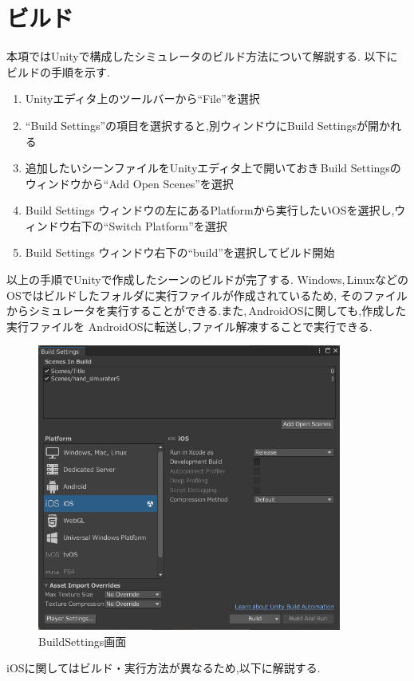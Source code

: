 \documentclass{ltjsreport}
\begin{document}
	\section{ビルド}
		本項ではUnityで構成したシミュレータのビルド方法について解説する.
		以下にビルドの手順を示す.
		\begin{enumerate}
			\item Unityエディタ上のツールバーから``File''を選択
			\item ``Build Settings''の項目を選択すると,別ウィンドウにBuild Settingsが開かれる
			\item 追加したいシーンファイルをUnityエディタ上で開いておき\,Build Settingsのウィンドウから``Add Open Scenes''を選択
			\item Build Settings ウィンドウの左にあるPlatformから実行したいOSを選択し,ウィンドウ右下の``Switch Platform''を選択
			\item Build Settings ウィンドウ右下の``build''を選択してビルド開始
		\end{enumerate}
		以上の手順でUnityで作成したシーンのビルドが完了する.
		Windows,\,LinuxなどのOSではビルドしたフォルダに実行ファイルが作成されているため,
		そのファイルからシミュレータを実行することができる.また,\,AndroidOSに関しても,作成した実行ファイルを
		AndroidOSに転送し,ファイル解凍することで実行できる.

		\begin{figure}[H]
		\centering
		\includegraphics[width = 10cm]{../figs/BuildSettings.png}
		\caption{BuildSettings画面}
		\label{fig:BuildSettings}
		\end{figure}
\vspace{-15pt}
			iOSに関してはビルド・実行方法が異なるため,以下に解説する.
\end{document}
